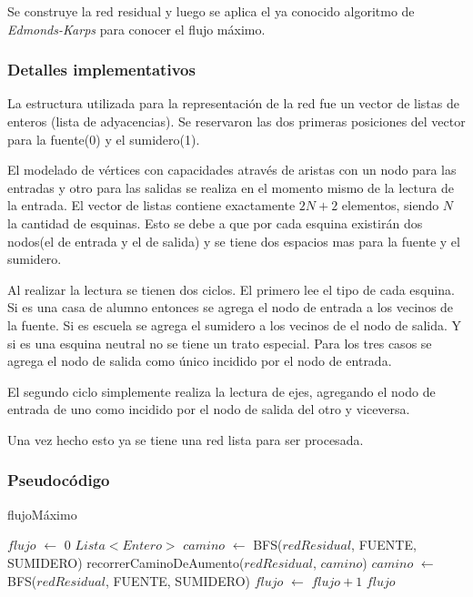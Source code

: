 Se construye la red residual y luego se aplica el ya conocido algoritmo de
\textit{Edmonds-Karps} para conocer el flujo máximo.

\subsubsection*{Detalles implementativos}

La estructura utilizada para la representación de la red fue un vector de
listas de enteros (lista de adyacencias). Se reservaron las dos primeras
posiciones del vector para la fuente(0) y el sumidero(1).

El modelado de vértices con capacidades através de aristas con un nodo para
las entradas y otro para las salidas se realiza en el momento mismo de la
lectura de la entrada. El vector de listas contiene exactamente $2N + 2$
elementos, siendo $N$ la cantidad de esquinas. Esto se debe a que por cada
esquina existirán dos nodos(el de entrada y el de salida) y se tiene dos
espacios mas para la fuente y el sumidero.

Al realizar la lectura se tienen dos ciclos. El primero lee el tipo de cada
esquina. Si es una casa de alumno entonces se agrega el nodo de entrada a los
vecinos de la fuente. Si es escuela se agrega el sumidero a los vecinos de el
nodo de salida. Y si es una esquina neutral no se tiene un trato especial.
Para los tres casos se agrega el nodo de salida como único incidido por el
nodo de entrada.

El segundo ciclo simplemente realiza la lectura de ejes, agregando el nodo de
entrada de uno como incidido por el nodo de salida del otro y viceversa.

Una vez hecho esto ya se tiene una red lista para ser procesada.

\subsubsection*{Pseudocódigo}


\begin{algorithm}[]
	\caption{flujoMáximo}

	$flujo$ $\gets$ 0 \;
	$Lista<Entero>$ $camino$ $\gets$ BFS($redResidual$, FUENTE, SUMIDERO) \;
	 {
		recorrerCaminoDeAumento($redResidual$, $camino$) \;
		$camino$ $\gets$ BFS($redResidual$, FUENTE, SUMIDERO) \;
		$flujo$ $\gets$ $flujo + 1$ \;
	}
	\Return $flujo$ \;
\end{algorithm}

